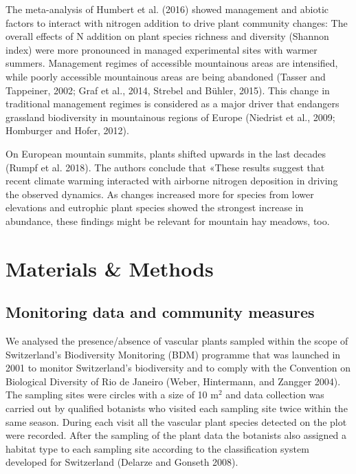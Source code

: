 \documentclass[fleqn,10pt,lineno]{wlpeerj} %
\theoremstyle{definition}
\theoremstyle{definition}
\theoremstyle{definition}
\theoremstyle{remark}
\begin{document}
The meta-analysis of Humbert et al. (2016) showed management and abiotic
factors to interact with nitrogen addition to drive plant community
changes: The overall effects of N addition on plant species richness and
diversity (Shannon index) were more pronounced in managed experimental
sites with warmer summers. Management regimes of accessible mountainous
areas are intensified, while poorly accessible mountainous areas are
being abandoned (Tasser and Tappeiner, 2002; Graf et al., 2014, Strebel
and Bühler, 2015). This change in traditional management regimes is
considered as a major driver that endangers grassland biodiversity in
mountainous regions of Europe (Niedrist et al., 2009; Homburger and
Hofer, 2012).

On European mountain summits, plants shifted upwards in the last decades
(Rumpf et al. 2018). The authors conclude that «These results suggest
that recent climate warming interacted with airborne nitrogen deposition
in driving the observed dynamics. As changes increased more for species
from lower elevations and eutrophic plant species showed the strongest
increase in abundance, these findings might be relevant for mountain hay
meadows, too.

\section*{Materials \& Methods}\label{materials-methods}

\subsection*{Monitoring data and community
measures}\label{monitoring-data-and-community-measures}

We analysed the presence/absence of vascular plants sampled within the
scope of Switzerland's Biodiversity Monitoring (BDM) programme that was
launched in 2001 to monitor Switzerland's biodiversity and to comply
with the Convention on Biological Diversity of Rio de Janeiro (Weber,
Hintermann, and Zangger 2004). The sampling sites were circles with a
size of 10 m\(^2\) and data collection was carried out by qualified
botanists who visited each sampling site twice within the same season.
During each visit all the vascular plant species detected on the plot
were recorded. After the sampling of the plant data the botanists also
assigned a habitat type to each sampling site according to the
classification system developed for Switzerland (Delarze and Gonseth
2008).
\end{document}
